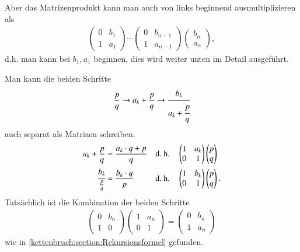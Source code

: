 Aber das Matrizenprodukt kann man auch von links beginnend ausmultiplizieren als
\begin{align*}
		\begin{pmatrix}
			0& b_1\\
			1& a_1
		\end{pmatrix}
		\cdots
		\begin{pmatrix}
			0& b_{n-1}\\
			1& a_{n-1}
		\end{pmatrix}
		\begin{pmatrix}
			b_n\\
			a_n
		\end{pmatrix},
\end{align*}
d.h. man kann bei $b_1, a_1$ beginnen, dies wird weiter unten im Detail
ausgeführt.

Man kann die beiden Schritte
\begin{align*}
\frac{p}{q} \rightarrow a_k + \frac{p}{q} \rightarrow \cfrac{b_k}{a_k + \cfrac{p}{q}}
\end{align*}
auch separat als Matrizen schreiben.
\begin{align*}
a_k + \frac{p}{q} &= \frac{a_k \cdot q + p}{q} &&\text{d.~h.} &&
	\begin{pmatrix}
		1& a_k\\
		0& 1
	\end{pmatrix}
	\begin{pmatrix}
		p\\
		q
	\end{pmatrix}
\\
\cfrac{b_k}{\frac{p}{q}} &= \frac{b_k \cdot q}{p} &&\text{d.~h.} &&
	\begin{pmatrix}
		1& b_k\\
		0& 1
	\end{pmatrix}
	\begin{pmatrix}
		p\\
		q
	\end{pmatrix}.
\end{align*}
Tatsächlich ist die Kombination der beiden Schritte
\begin{align*}
		\begin{pmatrix}
			0& b_n\\
			1& 0
		\end{pmatrix}
		\begin{pmatrix}
			1& a_n\\
			0& 1
		\end{pmatrix}
	=	\begin{pmatrix}
			0& b_n\\
			1& a_n
		\end{pmatrix}
\end{align*}
wie in \eqref{kettenbruch:section:Rekursionsformel}  gefunden.
